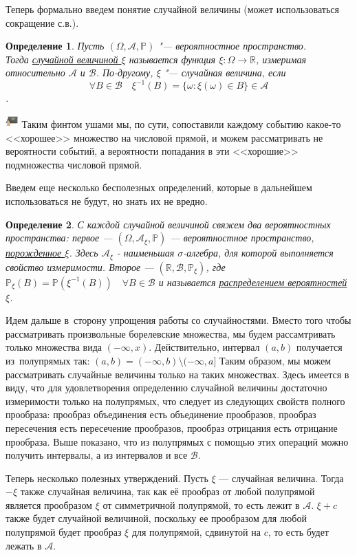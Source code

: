 \documentclass[12pt]{article}
\newtheorem{Def}{Определение}
\newenvironment{Wtf}{\includegraphics[height=5mm]{ping}}{}
\numberwithin{Th}{section}
\numberwithin{Def}{section}
\numberwithin{Lem}{section}
\numberwithin{St}{section}
\numberwithin{equation}{section}
\newcommand\Pro{\mathbb{P}}
\newcommand\Ev{\mathscr{A}}
\newcommand\Bor{\mathscr{B}}
\newcommand\Real{\mathbb{R}}
\begin{document}
Теперь формально введем понятие случайной величины (может использоваться сокращение с.в.).

\begin{Def}
Пусть $(\Omega, \Ev, \Pro)$ "--- вероятностное пространство.\\ Тогда \underline{случайной величиной $\xi$} называется функция $\xi : \Omega \to \Real$, измеримая относительно $\Ev$ и $\Bor$. По-другому, $\xi$ "--- случайная величина, если
$$\forall B \in \Bor \quad \xi^{-1}(B) = \lbrace \omega : \xi(\omega) \in B \rbrace \in \Ev$$.
\end{Def}
\begin{Wtf}
Таким финтом ушами мы, по сути, сопоставили каждому событию какое-то <<хорошее>> множество на числовой прямой, и можем рассматривать не вероятности событий, а вероятности попадания в эти <<хорошие>> подмножества числовой прямой.
\end{Wtf}

Введем еще несколько бесполезных определений, которые в дальнейшем использоваться не будут, но знать их не вредно.

\begin{Def}
С каждой случайной величиной свяжем два вероятностных пространства: первое --- $(\Omega, \Ev_\xi, \Pro)$ --- вероятностное пространство, \underline{порожденное $\xi$}. Здесь 
$\Ev_\xi$ - наименьшая $\sigma$-алгебра, для которой выполняется свойство измеримости. Второе --- $(\Real, \Bor, \Pro_\xi)$, где $\Pro_\xi(B) = \Pro(\xi^{-1}(B)) \quad \forall B \in \Bor$ и называется \underline{распределением вероятностей $\xi$}.
\end{Def}

Идем дальше в~сторону упрощения работы со случайностями. Вместо того чтобы рассматривать произвольные борелевские множества, мы будем рассамтривать только множества вида $(-\infty, x)$. Действительно, интервал $(a, b)$ получается из~полупрямых так: $(a, b) = (-\infty, b) \setminus (-\infty, a]$  Таким образом, мы можем рассматривать случайные величины только на таких множествах. Здесь имеется в виду, что для удовлетворения определению случайной величины достаточно измеримости только на
 полупрямых, что следует из следующих свойств полного прообраза: прообраз объединения есть объединение прообразов, прообраз пересечения есть пересечение прообразов,
 прообраз отрицания есть отрицание прообраза. Выше показано, что из полупрямых с помощью этих операций можно получить интервалы, а из интервалов и все $\Bor$.

Теперь несколько полезных утверждений. Пусть $\xi$ --- случайная величина. Тогда $-\xi$ также случайная величина, так как её прообраз от любой полупрямой является
прообразом $\xi$ от симметричной полупрямой, то есть лежит в $\Ev$. $\xi + c$ также будет случайной величиной, поскольку ее прообразом для любой полупрямой будет
прообраз $\xi$ для полупрямой, сдвинутой на $c$, то есть будет лежать в $\Ev$.
\end{document}
